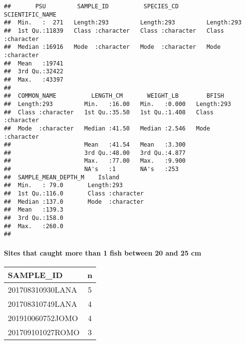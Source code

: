 \documentclass[
]{article}
\begin{document}
\begin{verbatim}
##       PSU         SAMPLE_ID          SPECIES_CD        SCIENTIFIC_NAME   
##  Min.   :  271   Length:293         Length:293         Length:293        
##  1st Qu.:11839   Class :character   Class :character   Class :character  
##  Median :16916   Mode  :character   Mode  :character   Mode  :character  
##  Mean   :19741                                                           
##  3rd Qu.:32422                                                           
##  Max.   :43397                                                           
##                                                                          
##  COMMON_NAME          LENGTH_CM       WEIGHT_LB        BFISH          
##  Length:293         Min.   :16.00   Min.   :0.000   Length:293        
##  Class :character   1st Qu.:35.50   1st Qu.:1.408   Class :character  
##  Mode  :character   Median :41.50   Median :2.546   Mode  :character  
##                     Mean   :41.54   Mean   :3.300                     
##                     3rd Qu.:48.00   3rd Qu.:4.877                     
##                     Max.   :77.00   Max.   :9.900                     
##                     NA's   :1       NA's   :253                       
##  SAMPLE_MEAN_DEPTH_M    Island         
##  Min.   : 79.0       Length:293        
##  1st Qu.:116.0       Class :character  
##  Median :137.0       Mode  :character  
##  Mean   :139.3                         
##  3rd Qu.:158.0                         
##  Max.   :260.0                         
## 
\end{verbatim}

\hypertarget{sites-that-caught-more-than-1-fish-between-20-and-25-cm}{%
\paragraph{Sites that caught more than 1 fish between 20 and 25
cm}\label{sites-that-caught-more-than-1-fish-between-20-and-25-cm}}

\captionsetup[table]{labelformat=empty,skip=1pt}
\begin{longtable}{lc}
\toprule
SAMPLE\_ID & n \\ 
\midrule
201708310930LANA & 5 \\ 
201708310749LANA & 4 \\ 
201910060752JOMO & 4 \\ 
201709101027ROMO & 3 \\ 
\bottomrule
\end{longtable}
\end{document}
